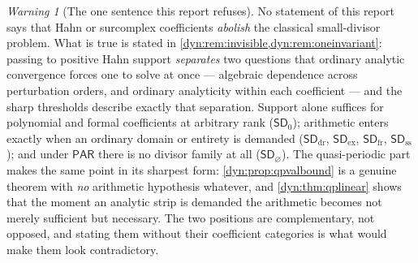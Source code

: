 \documentclass[11pt,letterpaper]{article}
\theoremstyle{definition}
\theoremstyle{remark}
\newtheorem{warning}[warning]{Warning}
\newcommand{\sdz}{\mathsf{SD}_{0}}
\newcommand{\sddr}{\mathsf{SD}_{\mathrm{dr}}}
\newcommand{\sdex}{\mathsf{SD}_{\mathrm{ex}}}
\newcommand{\sdfr}{\mathsf{SD}_{\mathrm{fr}}}
\newcommand{\sdno}{\mathsf{SD}_{\varnothing}}
\newcommand{\pares}{\mathsf{PAR}}
\newcommand{\sdss}{\mathsf{SD}_{\mathrm{ss}}}
\numberwithin{equation}{section}
\begin{document}
\begin{warning}[The one sentence this report refuses]
\label{dyn:warn:refuse}
No statement of this report says that Hahn or surcomplex coefficients
\emph{abolish} the classical small-divisor problem. What is true is stated
in \cref{dyn:rem:invisible,dyn:rem:oneinvariant}: passing to positive Hahn
support \emph{separates} two questions that ordinary analytic convergence
forces one to solve at once --- algebraic dependence across perturbation
orders, and ordinary analyticity within each coefficient --- and the sharp
thresholds describe exactly that separation. Support alone suffices for
polynomial and formal coefficients at arbitrary rank
($\sdz$); arithmetic enters exactly when an ordinary domain or entirety is
demanded ($\sddr$, $\sdex$, $\sdfr$, $\sdss$); and under $\pares$ there is
no divisor family at all ($\sdno$). The quasi-periodic part makes the same
point in its sharpest form: \cref{dyn:prop:qpvalbound} is a genuine
theorem with \emph{no} arithmetic hypothesis whatever, and
\cref{dyn:thm:qplinear} shows that the moment an analytic strip is demanded
the arithmetic becomes not merely sufficient but necessary. The two
positions are complementary, not opposed, and stating them without their
coefficient categories is what would make them look contradictory.
\end{warning}
\end{document}
